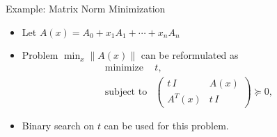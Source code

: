 \documentclass[10pt,ignorenonframetext,serif,onlymath]{beamer}
\providecommand{\tightlist}{%
  \setlength{\itemsep}{0pt}\setlength{\parskip}{0pt}}
\begin{document}
\begin{frame}{Example: Matrix Norm Minimization}
\protect\hypertarget{sec:example-matrix-norm-minimization}{}

\begin{itemize}
\tightlist
\item
  Let \(A(x) = A_0 + x_1 A_1 + \cdots + x_n A_n\)
\item
  Problem \(\min_x \| A(x) \|\) can be reformulated as
  \[\begin{array}{ll}
       \text{minimize}      & t, \\
       \text{subject to}    & \left(
   \begin{array}{cc}
    t\,I   & A(x) \\
    A^T(x) & t\,I
   \end{array} \right) \succeq 0,
   \end{array}\]
\item
  Binary search on \(t\) can be used for this problem.
\end{itemize}

\end{frame}
\end{document}
